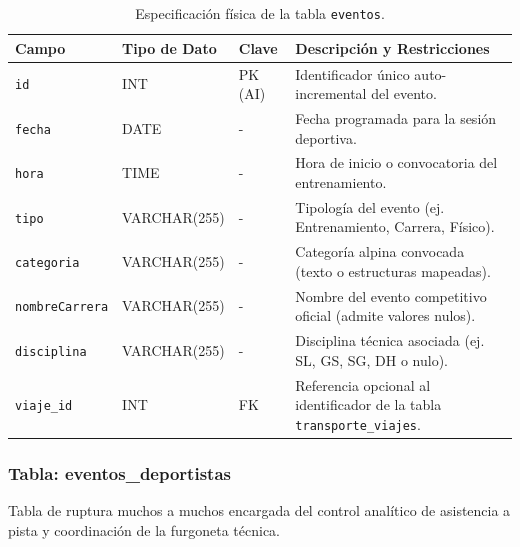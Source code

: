         \begin{table}[htbp]
        \centering
        \scriptsize
        \renewcommand{\arraystretch}{0.9}
        \setlength{\tabcolsep}{4pt}
        \begin{tabularx}{\textwidth}{|l|l|l|X|}
        \hline
        \rowcolor[HTML]{EFEFEF} 
        \textbf{Campo} & \textbf{Tipo de Dato} & \textbf{Clave} & \textbf{Descripción y Restricciones} \\ \hline
        \texttt{id} & INT & PK (AI) & Identificador único auto-incremental del evento. \\ \hline
        \texttt{fecha} & DATE & - & Fecha programada para la sesión deportiva. \\ \hline
        \texttt{hora} & TIME & - & Hora de inicio o convocatoria del entrenamiento. \\ \hline
        \texttt{tipo} & VARCHAR(255) & - & Tipología del evento (ej. Entrenamiento, Carrera, Físico). \\ \hline
        \texttt{categoria} & VARCHAR(255) & - & Categoría alpina convocada (texto o estructuras mapeadas). \\ \hline
        \texttt{nombreCarrera} & VARCHAR(255) & - & Nombre del evento competitivo oficial (admite valores nulos). \\ \hline
        \texttt{disciplina} & VARCHAR(255) & - & Disciplina técnica asociada (ej. SL, GS, SG, DH o nulo). \\ \hline
        \texttt{viaje\_id} & INT & FK & Referencia opcional al identificador de la tabla \texttt{transporte\_viajes}. \\ \hline
        \end{tabularx}
        \caption{Especificación física de la tabla \texttt{eventos}.}
        \label{tab:dic_eventos}
        \end{table}
        \newpage

        \subsubsection{Tabla: eventos\_deportistas}
        Tabla de ruptura muchos a muchos encargada del control analítico de asistencia a pista y coordinación de la furgoneta técnica.

